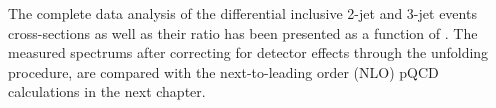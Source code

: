 The complete data analysis of the differential inclusive 2-jet and 3-jet events cross-sections as well as their ratio \ratio has been presented as a function of \httwo. The measured spectrums after correcting for detector effects through the unfolding procedure, are compared with the next-to-leading order (NLO) pQCD calculations in the next chapter. 
